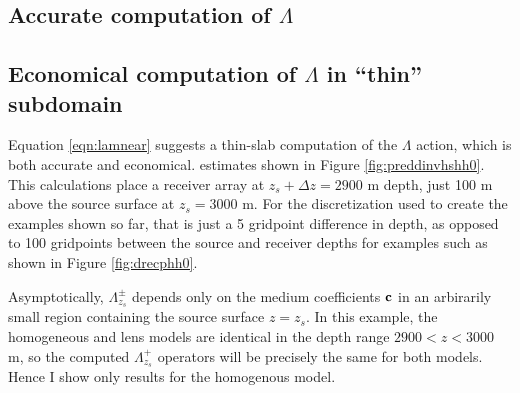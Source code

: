 \subsection{Accurate computation of $\Lambda$}


\subsection{Economical computation of $\Lambda$ in ``thin'' subdomain}
Equation \ref{eqn:lamnear} suggests a thin-slab computation of the
$\Lambda$ action, which is both accurate and economical. 
estimates shown in Figure \ref{fig:preddinvhshh0}. This calculations
place a receiver array at $z_s+\Delta z=2900$ m depth, just 100 m above the
source surface at $z_s=3000$ m. For the discretization used to create
the examples shown so far, that is just a 5 gridpoint difference in
depth, as opposed to 100 gridpoints between the source and receiver
depths for examples such as shown in Figure \ref{fig:drecphh0}.

Asymptotically, $\Lambda^{\pm}_{z_s}$ depends only on the medium
coefficients ${\bf c}$ in an arbirarily small region containing the
source surface $z=z_s$. In this example, the homogeneous and lens models are identical in the depth
range $2900 < z < 3000$ m, so the computed $\Lambda^+_{z_s}$ operators
will be precisely the same for both models. Hence I show only results for the
homogenous model.

